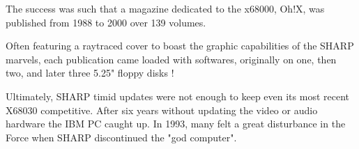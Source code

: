 \begin{trivia}
The success was such that a magazine dedicated to the x68000, Oh!X, was published from 1988 to 2000 over 139 volumes. 


\begin{minipage}[t]{0.32\linewidth}
\end{minipage}%
\hfill
\begin{minipage}[t]{0.32\linewidth}
\end{minipage}%
\hfill
\begin{minipage}[t]{0.322\linewidth}
\end{minipage}%



Often featuring a raytraced cover to boast the graphic capabilities of the SHARP marvels, each publication came loaded with softwares, originally on one, then two, and later three 5.25" floppy disks \cite{ohXarticle}!
\end{trivia}

Ultimately, SHARP timid updates were not enough to keep even its most recent X68030 competitive. After six years without updating the video or audio hardware the IBM PC caught up. In 1993, many felt a great disturbance in the Force when SHARP discontinued the "god computer".

